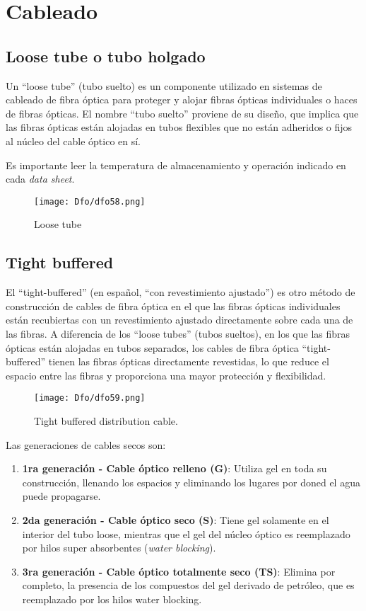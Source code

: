 \documentclass[
	12pt, %
	fleqn, %
	a4paper, %
	oneside, %
]{LegrandOrangeBook}
\begin{document}
\chapter{Cableado}
\section{Loose tube o tubo holgado}
Un ``loose tube'' (tubo suelto) es un componente utilizado en sistemas de cableado de fibra óptica para proteger y alojar fibras ópticas individuales o haces de fibras ópticas. El nombre ``tubo suelto'' proviene de su diseño, que implica que las fibras ópticas están alojadas en tubos flexibles que no están adheridos o fijos al núcleo del cable óptico en sí.
\begin{remark}
Es importante leer la temperatura de almacenamiento y operación indicado en cada \textit{data sheet}.
\end{remark}
\begin{figure}[H]
\centering
\texttt{[image: Dfo/dfo58.png]}
\caption{Loose tube}
\end{figure}
\section{Tight buffered}
El ``tight-buffered'' (en español, ``con revestimiento ajustado'') es otro método de construcción de cables de fibra óptica en el que las fibras ópticas individuales están recubiertas con un revestimiento ajustado directamente sobre cada una de las fibras. A diferencia de los ``loose tubes'' (tubos sueltos), en los que las fibras ópticas están alojadas en tubos separados, los cables de fibra óptica ``tight-buffered'' tienen las fibras ópticas directamente revestidas, lo que reduce el espacio entre las fibras y proporciona una mayor protección y flexibilidad.
\begin{figure}[H]
\centering
\texttt{[image: Dfo/dfo59.png]}
\caption{Tight buffered distribution cable.}
\end{figure}
Las generaciones de cables secos son:
\begin{enumerate}
\item \textbf{1ra generación - Cable óptico relleno (G)}: Utiliza gel en toda su construcción, llenando los espacios y eliminando los lugares por doned el agua puede propagarse.
\item \textbf{2da generación - Cable óptico seco (S)}: Tiene gel solamente en el interior del tubo loose, mientras que el gel del núcleo óptico es reemplazado por hilos super absorbentes (\textit{water blocking}).
\item \textbf{3ra generación - Cable óptico totalmente seco (TS)}: Elimina por completo, la presencia de los compuestos del gel derivado de petróleo, que es reemplazado por los hilos water blocking.
\end{enumerate}
\end{document}

